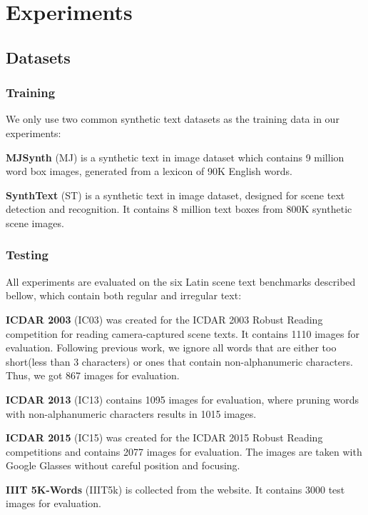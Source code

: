 \documentclass[final]{cvpr}
\begin{document}
\section{Experiments}

\subsection{Datasets}


\subsubsection{Training}
We only use two common synthetic text datasets as the training data in our experiments:

\textbf{MJSynth} (MJ) \cite{jaderberg14c} is a synthetic text in image dataset which contains 9 million word box images, generated from a lexicon of 90K English words.

\textbf{SynthText} (ST) \cite{gupta2016synthetic} is a synthetic text in image dataset, designed for scene text detection and recognition. It contains 8 million text boxes from 800K synthetic scene images.
\subsubsection{Testing}

All experiments are evaluated on the six Latin scene text benchmarks described bellow, which contain both regular and irregular text:

\textbf{ICDAR 2003} (IC03) \cite{lucas2005icdar} was created for the ICDAR 2003 Robust Reading competition for reading camera-captured scene texts. It contains 1110 images for evaluation. Following previous work\cite{baek2019wrong, lee2020recognizing}, we ignore all words that are either too short(less than 3 characters) or ones that contain non-alphanumeric characters. Thus, we got 867 images for evaluation.

\textbf{ICDAR 2013} (IC13) \cite{karatzas2013icdar} contains 1095 images for evaluation, where pruning words with non-alphanumeric characters results in 1015 images.

\textbf{ICDAR 2015} (IC15) \cite{karatzas2015icdar} was created for the ICDAR 2015 Robust Reading competitions and contains 2077 images for evaluation. The images are taken with Google Glasses without careful position and focusing.

\textbf{IIIT 5K-Words} (IIIT5k) \cite{mishra2012scene} is collected from the website. It contains 3000 test images for evaluation.
\end{document}
